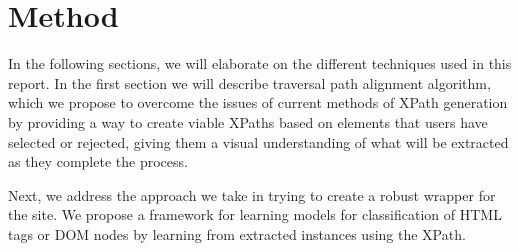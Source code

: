 \chapter{Method}
\label{chap:method}
In the following sections, we will elaborate on the different techniques used in this report.
In the first section we will describe traversal path alignment algorithm, which we
propose to overcome the issues of current methods of XPath generation by providing
a way to create viable XPaths based on elements that users have selected or rejected,
giving them a visual understanding of what will be extracted as they complete the process.

Next, we address the approach we take in trying to create a robust wrapper for the site.
We propose a framework for learning models for classification of HTML tags or DOM nodes by
learning from extracted instances using the XPath.



